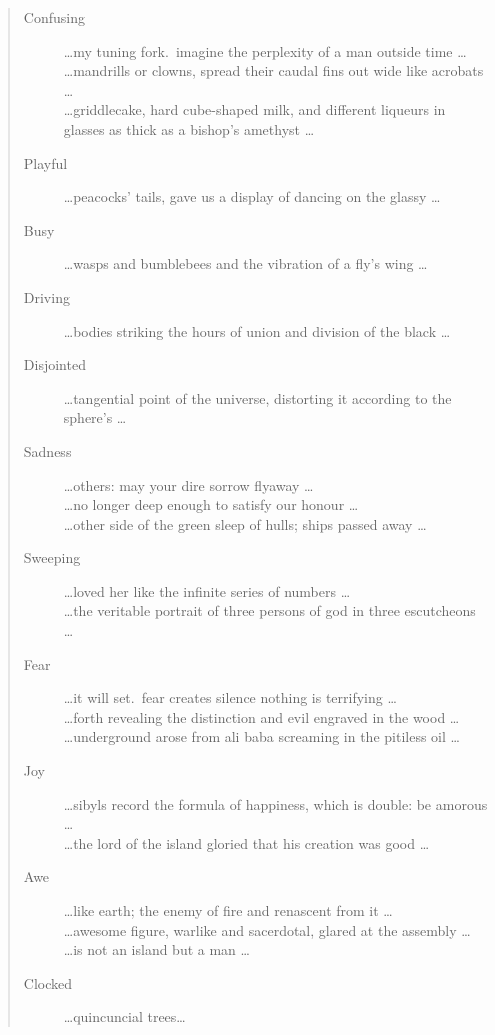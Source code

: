 \begin{quotation}
\begin{description}
  \item [Confusing] \ldots my tuning fork.\ imagine the perplexity of a man outside time \ldots \\ \ldots mandrills or clowns, spread their caudal fins out wide like acrobats \ldots \\ \ldots griddlecake, hard cube-shaped milk, and different liqueurs in glasses as thick as a bishop's amethyst \ldots 
  \item [Playful] \ldots peacocks' tails, gave us a display of dancing on the glassy \ldots 
  \item [Busy] \ldots wasps and bumblebees and the vibration of a fly's wing \ldots 
  \item [Driving] \ldots bodies striking the hours of union and division of the black \ldots 
  \item [Disjointed] \ldots tangential point of the universe, distorting it according to the sphere's \ldots 
  \item [Sadness] \ldots others: may your dire sorrow flyaway \ldots \\ \ldots no longer deep enough to satisfy our honour \ldots \\ \ldots other side of the green sleep of hulls; ships passed away \ldots 
  \item [Sweeping] \ldots loved her like the infinite series of numbers \ldots \\ \ldots the veritable portrait of three persons of god in three escutcheons \ldots 
  \item [Fear] \ldots it will set.\ fear creates silence nothing is terrifying \ldots \\ \ldots forth revealing the distinction and evil engraved in the wood \ldots \\ \ldots underground arose from ali baba screaming in the pitiless oil \ldots 
  \item [Joy] \ldots sibyls record the formula of happiness, which is double: be amorous \ldots \\ \ldots the lord of the island gloried that his creation was good \ldots 
  \item [Awe] \ldots like earth; the enemy of fire and renascent from it \ldots \\ \ldots awesome figure, warlike and sacerdotal, glared at the assembly \ldots \\ \ldots is not an island but a man \ldots 
  \item [Clocked] \ldots quincuncial trees\ldots 

\end{description}
\end{quotation}
